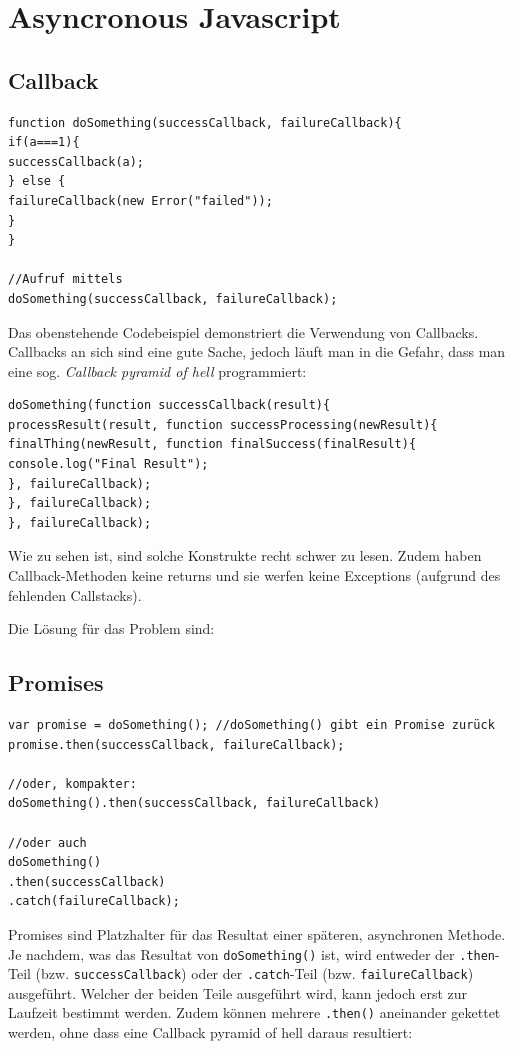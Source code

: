 \documentclass[a4paper, 11pt]{article}
\newcommand{\code}[1]{\texttt{#1}}
\begin{document}
\section{Asyncronous Javascript}
\subsection{Callback}
\begin{lstlisting}
function doSomething(successCallback, failureCallback){
if(a===1){
successCallback(a);
} else {
failureCallback(new Error("failed"));
}
}

//Aufruf mittels
doSomething(successCallback, failureCallback);
\end{lstlisting}
Das obenstehende Codebeispiel demonstriert die Verwendung von Callbacks. Callbacks an sich sind eine gute Sache, jedoch läuft man in die Gefahr, dass man eine sog. \textit{Callback pyramid of hell} programmiert:

\begin{lstlisting}
doSomething(function successCallback(result){
processResult(result, function successProcessing(newResult){
finalThing(newResult, function finalSuccess(finalResult){
console.log("Final Result");
}, failureCallback);
}, failureCallback);
}, failureCallback);
\end{lstlisting}
Wie zu sehen ist, sind solche Konstrukte recht schwer zu lesen. Zudem haben Callback-Methoden keine returns und sie werfen keine Exceptions (aufgrund des fehlenden Callstacks).

\noindent Die Lösung für das Problem sind:

\subsection{Promises}
\begin{lstlisting}
var promise = doSomething(); //doSomething() gibt ein Promise zurück
promise.then(successCallback, failureCallback);

//oder, kompakter:
doSomething().then(successCallback, failureCallback)

//oder auch
doSomething()
.then(successCallback)
.catch(failureCallback);
\end{lstlisting}

Promises sind Platzhalter für das Resultat einer späteren, asynchronen Methode. Je nachdem, was das Resultat von \code{doSomething()} ist, wird entweder der \code{.then}-Teil (bzw. \code{successCallback}) oder der \code{.catch}-Teil (bzw. \code{failureCallback}) ausgeführt. Welcher der beiden Teile ausgeführt wird, kann jedoch erst zur Laufzeit bestimmt werden. Zudem können mehrere \code{.then()} aneinander gekettet werden, ohne dass eine Callback pyramid of hell daraus resultiert:
\end{document}
